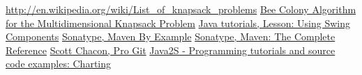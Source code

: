\documentclass[a4paper,12pt,notitlepage]{mwrep}
\begin{document}
\addtocounter{page}{-1}

\begin{thebibliography}{9}
	\href{http://en.wikipedia.org/wiki/List_of_knapsack_problems}{http://en.wikipedia.org/wiki/List\_of\_knapsack\_problems}
	\href{http://www.iaeng.org/publication/IMECS2008/IMECS2008_pp84-88.pdf}{Bee Colony Algorithm for the Multidimensional Knapsack Problem}
	\href{http://docs.oracle.com/javase/tutorial/uiswing/components/index.html}{Java tutorials, Lesson: Using Swing Components}
	\href{http://www.sonatype.com/Support/Books/Maven-By-Example}{Sonatype, Maven By Example}
	\href{http://www.sonatype.com/Support/Books/Maven-The-Complete-Reference}{Sonatype, Maven: The Complete Reference}
	\href{http://git-scm.com/book/}{Scott Chacon, Pro Git}
	\href{http://www.java2s.com/Code/Java/Chart/CatalogChart.htm}{Java2S - Programming tutorials and source code examples: Charting}
\end{thebibliography}


\label{LastPage}
\end{document}
